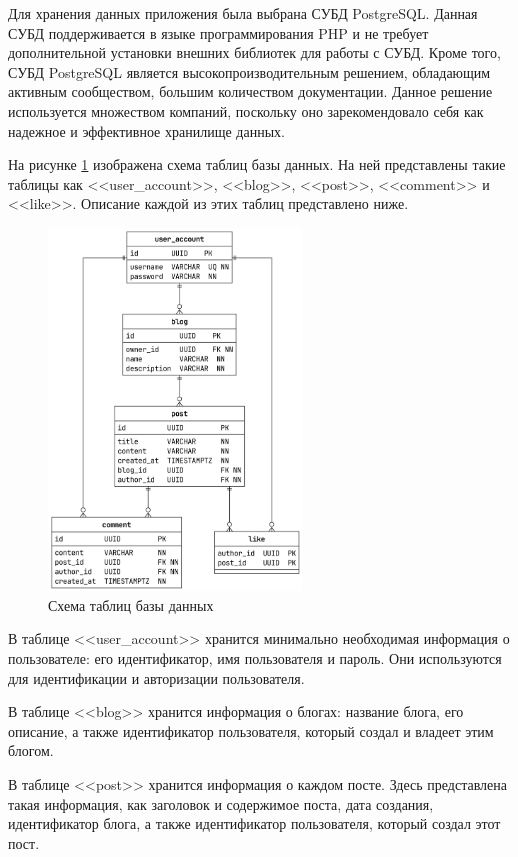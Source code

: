 \documentclass[a4paper, 14pt]{extarticle}
\begin{document}
Для хранения данных приложения была выбрана СУБД PostgreSQL. Данная СУБД
поддерживается в языке программирования PHP и не требует дополнительной
установки внешних библиотек для работы с СУБД. Кроме того, СУБД PostgreSQL
является высокопроизводительным решением, обладающим активным сообществом,
большим количеством документации. Данное решение используется множеством
компаний, поскольку оно зарекомендовало себя как надежное и эффективное
хранилище данных.

На рисунке \ref{fig:puml/database.png} изображена схема таблиц базы данных. На
ней представлены такие таблицы как <<user\_account>>, <<blog>>, <<post>>,
<<comment>> и <<like>>. Описание каждой из этих таблиц представлено ниже.

\begin{figure}[H]
  \centering
  \includegraphics[width=0.6\textwidth]{images/puml/database.png}
  \caption{Схема таблиц базы данных}
  \label{fig:puml/database.png}
\end{figure}

В таблице <<user\_account>> хранится минимально необходимая информация о
пользователе: его идентификатор, имя пользователя и пароль. Они используются для
идентификации и авторизации пользователя.

В таблице <<blog>> хранится информация о блогах: название блога, его описание, а
также идентификатор пользователя, который создал и владеет этим блогом.

В таблице <<post>> хранится информация о каждом посте. Здесь представлена такая
информация, как заголовок и содержимое поста, дата создания, идентификатор
блога, а также идентификатор пользователя, который создал этот пост.
\end{document}
